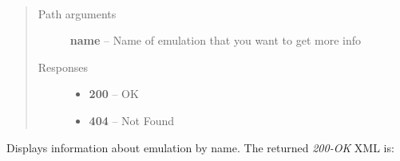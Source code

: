 \documentclass[letterpaper,10pt,english]{sphinxmanual}
\begin{document}

\begin{fulllineitems}
\label{01_how_to_use_it:method-get-emulations-name-}~\begin{quote}\begin{description}
\item[{Path arguments}] \leavevmode
\textbf{name} -- Name of emulation that you want to get more info

\item[{Responses}] \leavevmode\begin{itemize}
\item {} 
\textbf{200} -- OK

\item {} 
\textbf{404} -- Not Found

\end{itemize}

\end{description}\end{quote}

Displays information about emulation by name. The returned \emph{200-OK} XML is:


\end{fulllineitems}
\end{document}
